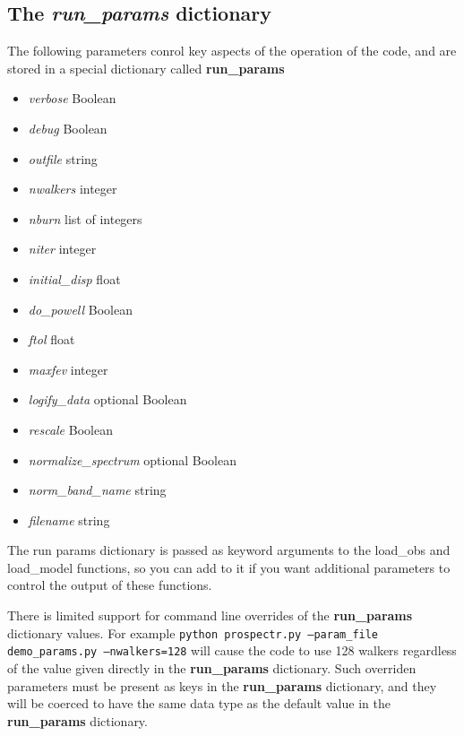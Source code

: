 \subsection{The \emph{run_params} dictionary}
The following parameters conrol key aspects of the operation of the
code, and are stored in a special dictionary called {\bf run_params}

\begin{itemize}
\item {\it verbose} Boolean
\item {\it debug} Boolean
\item {\it outfile} string

\item {\it nwalkers} integer
\item {\it nburn} list of integers
\item {\it niter} integer

\item {\it initial_disp} float
\item {\it do_powell} Boolean
\item {\it ftol} float
\item {\it maxfev} integer


\item {\it logify_data} optional Boolean
\item {\it rescale} Boolean
\item {\it normalize_spectrum} optional Boolean
\item {\it norm_band_name} string

\item {\it filename} string
\end{itemize}

The run params dictionary is passed as keyword arguments to the
load_obs and load_model functions, so you can add to it if you want
additional parameters to control the output of these functions.

There is limited support for command line overrides of the {\bf
run_params} dictionary values. For example
\texttt{python prospectr.py --param_file demo_params.py
  --nwalkers=128}
will cause the code to use 128 walkers regardless of the value given
directly in the {\bf run_params} dictionary.  Such overriden
parameters must be present as keys in the {\bf run_params} dictionary,
and they will be coerced to have the same data type as the default
value in the {\bf run_params} dictionary.

